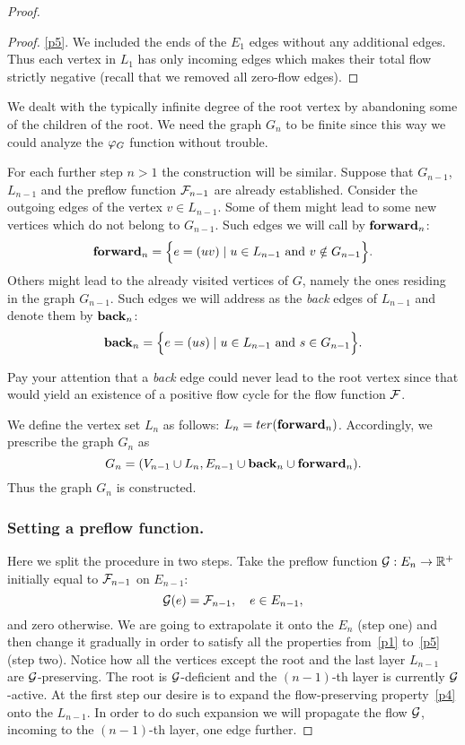 \documentclass[12pt]{amsart}
\begin{document}
\begin{proof}
\begin{proof}
        \noindent \ref{p5}. We included the ends of the $E_1$ edges without any additional edges.
        Thus each vertex in $L_1$ has only incoming edges which makes their
          total flow strictly negative (recall that we removed all zero-flow edges).
      \end{proof}
      \begin{note}
        We dealt with the typically infinite degree of the root vertex by abandoning some of the children of the root.
        We need the graph $G_n$ to be finite since this way we could analyze the $\gfi$ function without trouble.
      \end{note}
      For each further step $n > 1$ the construction will be similar.
      Suppose that $G_{n-1}$, $L_{n-1}$ and the preflow function $\flowposn{n-1}$ are already established.
      Consider the outgoing edges of the vertex $v \in L_{n-1}$.
      Some of them might lead to some new vertices which do not belong to $G_{n-1}$.
      Such edges we will call by $\efor_n$:
      \[
        \efor_n = \Big\{ e = (uv) \mid u \in L_{n-1} \text{ and } v \notin G_{n-1}\Big\}.
      \]
      Others might lead to the already visited vertices of $G$, namely the ones residing in the graph $G_{n-1}$.
      Such edges we will address as the \emph{back} edges of $L_{n-1}$ and denote them by $\eback_n$:
      \[
        \eback_n = \Big\{e = (us) \mid u \in L_{n-1} \text{ and } s \in G_{n-1}\Big\}.
      \]
      \begin{remark}
        Pay your attention that a \emph{back} edge could never lead to the root vertex since that
          would yield an existence of a positive flow cycle for the flow function $\flowpos$.
      \end{remark}
      We define the vertex set $L_n$ as follows: $L_n = \ter(\efor_n)$.
      Accordingly, we prescribe the graph $G_n$ as
      \[
        G_n = (V_{n-1} \cup L_n, E_{n-1} \cup \eback_n \cup \efor_n).
      \]
      Thus the graph $G_n$ is constructed.

      \subsubsection*{Setting a preflow function.}

      Here we split the procedure in two steps.
      Take the preflow function $\cal{G}: E_n \to \mathbb{R}^{+}$ initially equal to $\flowposn{n-1}$ on $E_{n-1}$:
      \[
        \cal{G}(e) = \flowposn{n-1}, \quad e \in E_{n-1},
      \]
      and zero otherwise.
      We are going to extrapolate it onto the $E_n$ (step one) and then change it gradually in order
        to satisfy all the properties from~\ref{p1} to~\ref{p5} (step two).
      Notice how all the vertices except the root and the last layer $L_{n-1}$ are $\cal{G}$-preserving.
      The root is $\cal{G}$-deficient and the $(n-1)$-th layer is currently $\cal{G}$-active.
      At the first step our desire is to expand the flow-preserving property~\ref{p4} onto the $L_{n-1}$.
      In order to do such expansion we will propagate the flow $\cal{G}$, incoming to the $(n-1)$-th layer, one edge further.


\end{proof}
\end{document}

